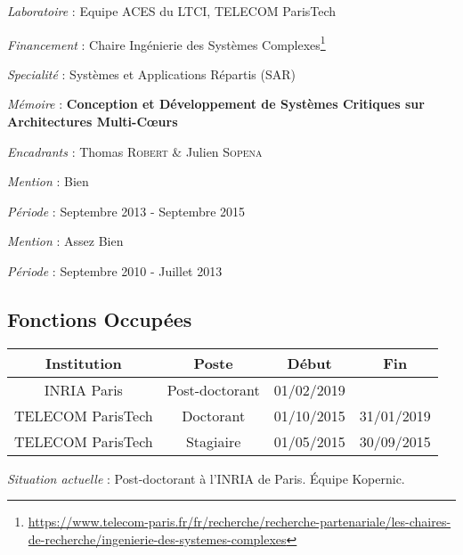\documentclass{article}
\begin{document}
\textit{Laboratoire} : Equipe ACES du LTCI, TELECOM ParisTech

\textit{Financement} : Chaire Ingénierie des Systèmes 
Complexes\footnote{\url{https://www.telecom-paris.fr/fr/recherche/recherche-partenariale/les-chaires-de-recherche/ingenierie-des-systemes-complexes}}

\begin{center}
\end{center}

\textit{Specialité} : Systèmes et Applications Répartis (SAR)

\textit{Mémoire} : \textbf{Conception et Développement de Systèmes Critiques sur Architectures 
	Multi-C\oe{}urs}

\textit{Encadrants} : Thomas \textsc{Robert} \& Julien \textsc{Sopena} 

\textit{Mention} : Bien

\textit{Période} : 	Septembre 2013 - Septembre 2015



\begin{center}
\end{center}

\textit{Mention} : Assez Bien

\textit{Période} : 	Septembre 2010 - Juillet 2013

\subsection{Fonctions Occupées}


\begin{table}[h]
	\begin{tabular}{|c|c|c|c|}
		\hline
		Institution       & Poste          & Début      & Fin        \\ \hline
		INRIA Paris       & Post-doctorant & 01/02/2019 &            \\ \hline
		TELECOM ParisTech & Doctorant      & 01/10/2015 & 31/01/2019 \\ \hline
		TELECOM ParisTech & Stagiaire      & 01/05/2015 & 30/09/2015 \\ \hline
	\end{tabular}
\end{table}

\textit{Situation actuelle} : Post-doctorant à l'INRIA de Paris. Équipe Kopernic.
\end{document}
